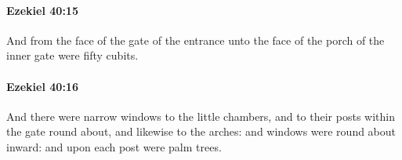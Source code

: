		\paragraph{Ezekiel 40:15} %
			\label{EZEKIEL-40-15}

			And from the face of the gate of the entrance unto the face of the porch of the inner gate were fifty cubits.


		\paragraph{Ezekiel 40:16} %
			\label{EZEKIEL-40-16}

			And there were narrow windows to the little chambers, and to their posts within the gate round about, and likewise to the arches: and windows were round about inward: and upon each post were palm trees.


